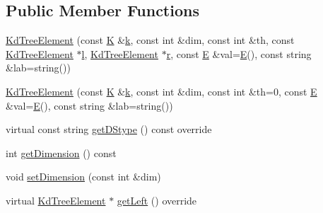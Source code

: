 \subsection*{Public Member Functions}
\begin{DoxyCompactItemize}
\item 
\mbox{\hyperlink{classbridges_1_1_kd_tree_element_a0a50d048eb39497beed77ed4b0566876}{Kd\+Tree\+Element}} (const \mbox{\hyperlink{namespacebridges_acfb0a4f7877d8f63de3e6862004c50edaa5f3c6a11b03839d46af9fb43c97c188}{K}} \&\mbox{\hyperlink{namespacebridges_acfb0a4f7877d8f63de3e6862004c50eda8ce4b16b22b58894aa86c421e8759df3}{k}}, const int \&dim, const int \&th, const \mbox{\hyperlink{classbridges_1_1_kd_tree_element}{Kd\+Tree\+Element}} $\ast$\mbox{\hyperlink{namespacebridges_acfb0a4f7877d8f63de3e6862004c50eda2db95e8e1a9267b7a1188556b2013b33}{l}}, \mbox{\hyperlink{classbridges_1_1_kd_tree_element}{Kd\+Tree\+Element}} $\ast$\mbox{\hyperlink{namespacebridges_acfb0a4f7877d8f63de3e6862004c50eda4b43b0aee35624cd95b910189b3dc231}{r}}, const \mbox{\hyperlink{namespacebridges_acfb0a4f7877d8f63de3e6862004c50eda3a3ea00cfc35332cedf6e5e9a32e94da}{E}} \&val=\mbox{\hyperlink{namespacebridges_acfb0a4f7877d8f63de3e6862004c50eda3a3ea00cfc35332cedf6e5e9a32e94da}{E}}(), const string \&lab=string())
\item 
\mbox{\hyperlink{classbridges_1_1_kd_tree_element_a50774bfe7e28ddb78bc0da8acec70eb2}{Kd\+Tree\+Element}} (const \mbox{\hyperlink{namespacebridges_acfb0a4f7877d8f63de3e6862004c50edaa5f3c6a11b03839d46af9fb43c97c188}{K}} \&\mbox{\hyperlink{namespacebridges_acfb0a4f7877d8f63de3e6862004c50eda8ce4b16b22b58894aa86c421e8759df3}{k}}, const int \&dim, const int \&th=0, const \mbox{\hyperlink{namespacebridges_acfb0a4f7877d8f63de3e6862004c50eda3a3ea00cfc35332cedf6e5e9a32e94da}{E}} \&val=\mbox{\hyperlink{namespacebridges_acfb0a4f7877d8f63de3e6862004c50eda3a3ea00cfc35332cedf6e5e9a32e94da}{E}}(), const string \&lab=string())
\item 
virtual const string \mbox{\hyperlink{classbridges_1_1_kd_tree_element_acdd8f989986b7dd42cfacec73cf52dcb}{get\+D\+Stype}} () const override
\item 
int \mbox{\hyperlink{classbridges_1_1_kd_tree_element_aa7b34640fafac747b2e1185572e3dcc8}{get\+Dimension}} () const
\item 
void \mbox{\hyperlink{classbridges_1_1_kd_tree_element_a8c2c8503d8c8aa0db31fa834dffb60b0}{set\+Dimension}} (const int \&dim)
\item 
virtual \mbox{\hyperlink{classbridges_1_1_kd_tree_element}{Kd\+Tree\+Element}} $\ast$ \mbox{\hyperlink{classbridges_1_1_kd_tree_element_ad7db63a4f82f5252c7e0809ac6486cb4}{get\+Left}} () override

\end{DoxyCompactItemize}
